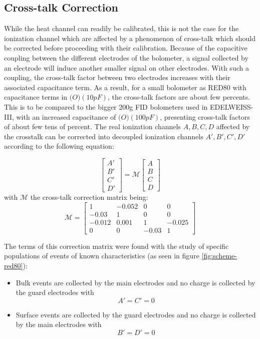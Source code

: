 \subsection{Cross-talk Correction}

While the heat channel can readily be calibrated, this is not the case for the ionization channel which are affected by a phenomenon of cross-talk which should be corrected before proceeding with their calibration.
Because of the capacitive coupling between the different electrodes of the bolometer, a signal collected by an electrode will induce another smaller signal on other electrodes. With such a coupling, the cross-talk factor between two electrodes increases with their associated capacitance term.
As a result, for a small bolometer as RED80 with capacitance terms in $\mathcal(O)(10 pF)$, the cross-talk factors are about few percents. This is to be compared to the bigger 200g FID bolometers used in EDELWEISS-III, with an increased capacitance of $\mathcal(O)(100 pF)$, presenting cross-talk factors of about few tens of percent.
The real ionization channels $A,B,C,D$ affected by the crosstalk can be corrected into decoupled ionization channels $A', B', C', D'$ according to the following equation:

\begin{equation}
	\left[\begin{array}{c}
	A' \\ 
	B' \\ 
	C' \\ 
	D'
	\end{array}\right]
	=
	\mathcal{M}
	\left[\begin{array}{c}
	A \\ 
	B \\ 
	C \\ 
	D
	\end{array} \right]
\end{equation}
with $\mathcal{M}$ the cross-talk correction matrix being:
\begin{equation}
	\mathcal{M}
	=
	\left[\begin{array}{cccc}
	1 & -0.052 & 0 & 0 \\ 
	-0.03 & 1 & 0 & 0 \\ 
	-0.012 & 0.001 & 1 & -0.025 \\ 
	0 & 0 & -0.03 & 1
	\end{array}\right]
\end{equation}

The terms of this correction matrix were found with the study of specific populations of events of known characteristics (as seen in figure \ref{fig:scheme-red80}):
\begin{itemize}
	\item Bulk events are collected by the main electrodes and no charge is collected by the guard electrodes with $$A'= C' = 0$$
	\item Surface events are collected by the guard electrodes and no charge is collected by the main electrodes with $$B' = D' = 0$$
\end{itemize}

